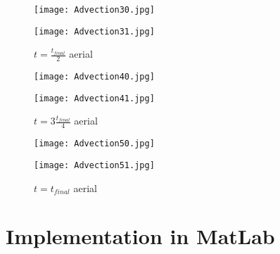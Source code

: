 \documentclass[12pt]{article}
\begin{document}
\begin{figure}[!tbp]
  \centering
  \begin{minipage}[b]{0.49\textwidth}
    \texttt{[image: Advection30.jpg]}
    \caption{$t=\frac{t_{final}}{2}$}
  \end{minipage}
  \hfill
  \begin{minipage}[b]{0.49\textwidth}
    \texttt{[image: Advection31.jpg]}
    \caption{$t=\frac{t_{final}}{2}$ aerial}
  \end{minipage}
\end{figure}
\begin{figure}[!tbp]
  \centering
  \begin{minipage}[b]{0.49\textwidth}
    \texttt{[image: Advection40.jpg]}
    \caption{$t=3\frac{t_{final}}{4}$}
  \end{minipage}
  \hfill
  \begin{minipage}[b]{0.49\textwidth}
    \texttt{[image: Advection41.jpg]}
    \caption{$t=3\frac{t_{final}}{4}$ aerial}
  \end{minipage}
\end{figure}
\begin{figure}[!tbp]
  \centering
  \begin{minipage}[b]{0.49\textwidth}
    \texttt{[image: Advection50.jpg]}
    \caption{$t=t_{final}$}
  \end{minipage}
  \hfill
  \begin{minipage}[b]{0.49\textwidth}
    \texttt{[image: Advection51.jpg]}
    \caption{$t=t_{final}$ aerial}
  \end{minipage}
\end{figure}

\appendix
\section{Implementation in MatLab}\label{sec::appendix}
\end{document}
